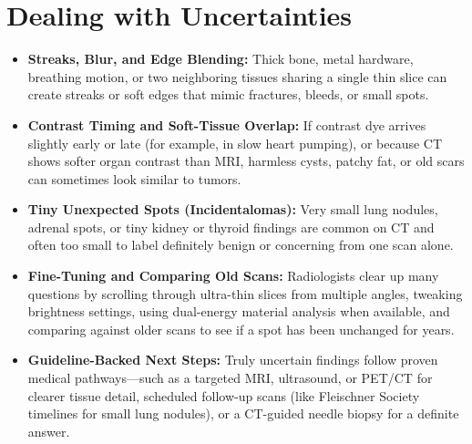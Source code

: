 \section{Dealing with Uncertainties}
\begin{itemize}
    \item \textbf{Streaks, Blur, and Edge Blending:} Thick bone, metal hardware, breathing motion, or two neighboring tissues sharing a single thin slice can create streaks or soft edges that mimic fractures, bleeds, or small spots.
    \item \textbf{Contrast Timing and Soft-Tissue Overlap:} If contrast dye arrives slightly early or late (for example, in slow heart pumping), or because CT shows softer organ contrast than MRI, harmless cysts, patchy fat, or old scars can sometimes look similar to tumors.
    \item \textbf{Tiny Unexpected Spots (Incidentalomas):} Very small lung nodules, adrenal spots, or tiny kidney or thyroid findings are common on CT and often too small to label definitely benign or concerning from one scan alone.
    \item \textbf{Fine-Tuning and Comparing Old Scans:} Radiologists clear up many questions by scrolling through ultra-thin slices from multiple angles, tweaking brightness settings, using dual-energy material analysis when available, and comparing against older scans to see if a spot has been unchanged for years.
    \item \textbf{Guideline-Backed Next Steps:} Truly uncertain findings follow proven medical pathways---such as a targeted MRI, ultrasound, or PET/CT for clearer tissue detail, scheduled follow-up scans (like Fleischner Society timelines for small lung nodules), or a CT-guided needle biopsy for a definite answer.
\end{itemize}

